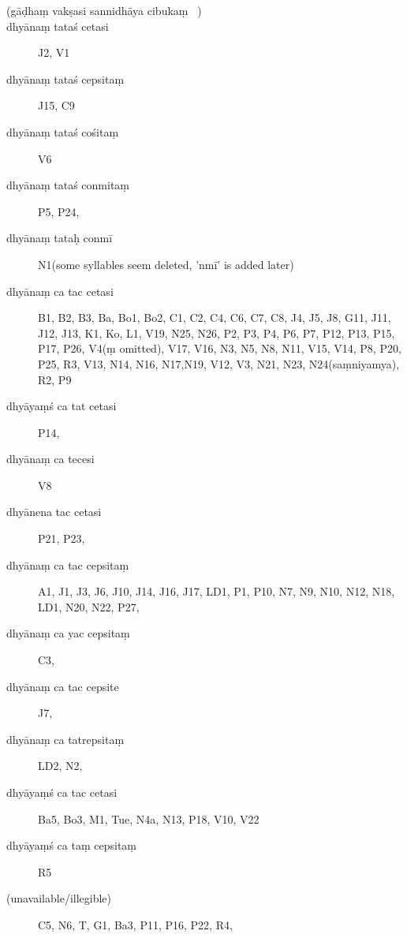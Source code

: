 \begin{ekdosis}

 
 \begin{marma}[hp01_048]
   \begin{description}
\item[(gāḍhaṃ vakṣasi sannidhāya cibukaṃ ~)]
\item[dhyānaṃ tataś cetasi]    J2, V1
\item[dhyānaṃ tataś cepsitaṃ]    J15, C9
\item[dhyānaṃ tataś cośitaṃ]    V6
\item[dhyānaṃ tataś conmitaṃ]    P5, P24, 
\item[dhyānaṃ tataḥ conmī]    N1(some syllables seem deleted, 'nmī' is added later)
\item[dhyānaṃ ca tac cetasi] B1, B2, B3, Ba, Bo1, Bo2, C1, C2, C4, C6, C7, C8, J4, J5, J8, G11, J11, J12, J13, K1, Ko, L1, V19, N25, N26, P2, P3, P4, P6, P7, P12, P13, P15, P17, P26, V4(ṃ omitted), V17, V16, N3, N5, N8, N11, V15, V14, P8, P20, P25, R3, V13, N14, N16, N17,N19, V12, V3, N21, N23,  N24(saṃniyamya), R2, P9
\item[dhyāyaṃś ca tat cetasi] P14,
\item[dhyānaṃ ca tecesi]    V8
\item[dhyānena tac cetasi] P21, P23, 
\item[dhyānaṃ ca tac cepsitaṃ] A1, J1, J3, J6, J10, J14, J16, J17, LD1, P1, P10, N7, N9, N10, N12, N18, LD1, N20, N22, P27, 
\item[dhyānaṃ ca yac cepsitaṃ]    C3,
\item[dhyānaṃ ca tac cepsite]    J7,
\item[dhyānaṃ ca tatrepsitaṃ]    LD2, N2,
\item[dhyāyaṃś ca tac cetasi]    Ba5, Bo3, M1, Tue, N4a, N13, P18, V10, V22
\item[dhyāyaṃś ca taṃ cepsitaṃ]    R5
\item[(unavailable/illegible)]   C5, N6, T, G1, Ba3, P11, P16, P22, R4, 
    \end{description}


\end{marma}
\end{ekdosis}
